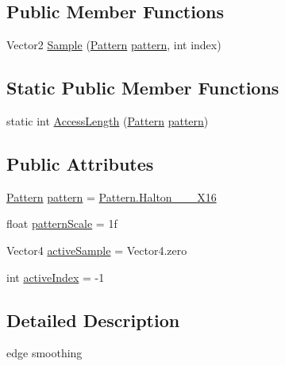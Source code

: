 \subsection*{Public Member Functions}
\begin{DoxyCompactItemize}
\item 
Vector2 \mbox{\hyperlink{class_frustum_jitter_a877d61fdb3075c72bc3ccb37601ef6a6}{Sample}} (\mbox{\hyperlink{class_frustum_jitter_a11a9007fdc6ca37500098c619213e3d3}{Pattern}} \mbox{\hyperlink{class_frustum_jitter_a9caeef1e4e2e6009d2c4c1660c8ab343}{pattern}}, int index)
\end{DoxyCompactItemize}
\subsection*{Static Public Member Functions}
\begin{DoxyCompactItemize}
\item 
static int \mbox{\hyperlink{class_frustum_jitter_a051b9c6bfb40a875e861abd1d4c8eff8}{Access\+Length}} (\mbox{\hyperlink{class_frustum_jitter_a11a9007fdc6ca37500098c619213e3d3}{Pattern}} \mbox{\hyperlink{class_frustum_jitter_a9caeef1e4e2e6009d2c4c1660c8ab343}{pattern}})
\end{DoxyCompactItemize}
\subsection*{Public Attributes}
\begin{DoxyCompactItemize}
\item 
\mbox{\hyperlink{class_frustum_jitter_a11a9007fdc6ca37500098c619213e3d3}{Pattern}} \mbox{\hyperlink{class_frustum_jitter_a9caeef1e4e2e6009d2c4c1660c8ab343}{pattern}} = \mbox{\hyperlink{class_frustum_jitter_a11a9007fdc6ca37500098c619213e3d3a390fb61cff8b97c3c7dfc3b010832202}{Pattern.\+Halton\+\_\+\_\+\_\+\+X16}}
\item 
float \mbox{\hyperlink{class_frustum_jitter_a57b3b58b7a2445776879406ab3bacffc}{pattern\+Scale}} = 1f
\item 
Vector4 \mbox{\hyperlink{class_frustum_jitter_aa36f188baa51ae0f98e526ebb9c7ce9e}{active\+Sample}} = Vector4.\+zero
\item 
int \mbox{\hyperlink{class_frustum_jitter_a69f5661b1f89b2fd3f86c6eb406f0687}{active\+Index}} = -\/1
\end{DoxyCompactItemize}


\subsection{Detailed Description}
edge smoothing 



